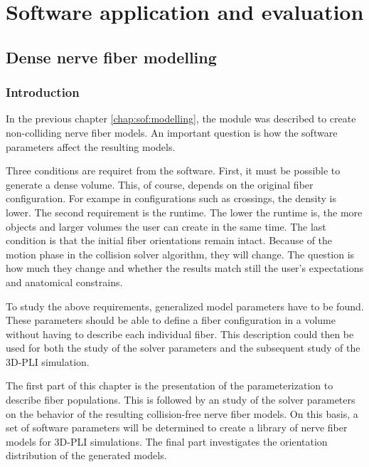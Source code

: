 \newpage\null\thispagestyle{empty}\newpage
\clearpage{\thispagestyle{empty}\cleardoublepage}
\part{Software application and evaluation}
\parttoc
% 
% 
% 
\setcounter{chapter}{7}
\chapter{Dense nerve fiber modelling}
\label{cha:model_analysis}
% 
\section{Introduction}
%
In the previous chapter \cref{chap:sof:modelling}, the module  was described to create non-colliding nerve fiber models.
An important question is how the software parameters affect the resulting models.
\par
%
Three conditions are requiret from the software.
First, it must be possible to generate a dense volume.
This, of course, depends on the original fiber configuration.
For exampe in configurations such as crossings, the density is lower.
The second requirement is the runtime.
The lower the runtime is, the more objects and larger volumes the user can create in the same time.
The last condition is that the initial fiber orientations remain intact.
Because of the motion phase in the collision solver algorithm, they will change.
The question is how much they change and whether the results match still the user's expectations and anatomical constrains.
\par
%
To study the above requirements, generalized model parameters have to be found.
These parameters should be able to define a fiber configuration in a volume without having to describe each individual fiber.
This description could then be used for both the study of the solver parameters and the subsequent study of the \ac{3D-PLI} simulation.
\par
%
The first part of this chapter is the presentation of the parameterization to describe fiber populations.
This is followed by an study of the solver parameters on the behavior of the resulting collision-free nerve fiber models.
On this basis, a set of software parameters will be determined to create a library of nerve fiber models for \ac{3D-PLI} simulations.
The final part investigates the orientation distribution of the generated models.
%
%
%
